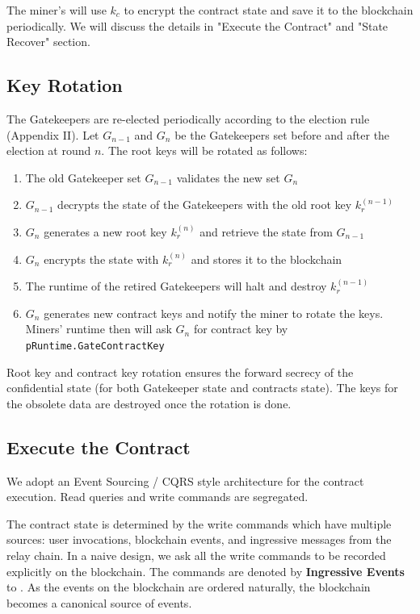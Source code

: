 The miner's \pruntime will use $k_c$ to encrypt the contract state and save it to the blockchain periodically. We will discuss the details in "Execute the Contract" and "State Recover" section.

\subsection{Key Rotation}

The Gatekeepers are re-elected periodically according to the election rule (Appendix II). Let $G_{n-1}$ and $G_n$ be the Gatekeepers set before and after the election at round $n$. The root keys will be rotated as follows:

\begin{enumerate}
    \item The old Gatekeeper set $G_{n-1}$ validates the new set $G_n$
    \item $G_{n-1}$ decrypts the state of the Gatekeepers with the old root key $k_r^{(n-1)}$
    \item $G_n$ generates a new root key $k_r^{(n)}$ and retrieve the state from $G_{n-1}$
    \item $G_n$ encrypts the state with $k_r^{(n)}$ and stores it to the blockchain
    \item The runtime of the retired Gatekeepers will halt and destroy $k_r^{(n-1)}$
    \item $G_n$ generates new contract keys and notify the miner to rotate the keys. Miners' runtime then will ask $G_n$ for contract key by \texttt{pRuntime.GateContractKey}
\end{enumerate}

Root key and contract key rotation ensures the forward secrecy of the confidential state (for both Gatekeeper state and contracts state). The keys for the obsolete data are destroyed once the rotation is done.

\subsection{Execute the Contract}

We adopt an Event Sourcing / CQRS style architecture for the contract execution. Read queries and write commands are segregated.

The contract state is determined by the write commands which have multiple sources: user invocations, blockchain events, and ingressive messages from the relay chain. In a naive design, we ask all the write commands to be recorded explicitly on the blockchain. The commands are denoted by \textbf{Ingressive Events} to \pruntime. As the events on the blockchain are ordered naturally, the blockchain becomes a canonical source of events.

